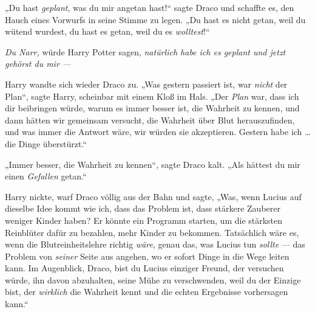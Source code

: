 „Du hast \emph{geplant}, was du mir angetan hast!“ sagte Draco und schaffte es, den Hauch eines Vorwurfs in seine Stimme zu legen.
„Du hast es nicht getan, weil du wütend wurdest, du hast es getan, weil du es \emph{wolltest}!“

\emph{Du Narr,} würde Harry Potter sagen, \emph{natürlich habe ich es geplant und jetzt gehörst du mir —}

Harry wandte sich wieder Draco zu.
„Was gestern passiert ist, war \emph{nicht} der Plan“, sagte Harry, scheinbar mit einem Kloß im Hals.
„Der \emph{Plan} war, dass ich dir beibringen würde, warum es immer besser ist, die Wahrheit zu kennen, und dann hätten wir gemeinsam versucht, die Wahrheit über Blut herauszufinden, und was immer die Antwort wäre, wir würden sie akzeptieren. Gestern habe ich … die Dinge überstürzt.“

„Immer besser, die Wahrheit zu kennen“, sagte Draco kalt.
„Als hättest du mir einen \emph{Gefallen} getan.“

Harry nickte, warf Draco völlig aus der Bahn und sagte,
„Was, wenn Lucius auf dieselbe Idee kommt wie ich, dass das Problem ist, dass stärkere Zauberer weniger Kinder haben? Er könnte ein Programm starten, um die stärksten Reinblüter dafür zu bezahlen, mehr Kinder zu bekommen. Tatsächlich wäre es, wenn die Blutreinheitslehre richtig \emph{wäre}, genau das, was Lucius tun \emph{sollte} — das Problem von \emph{seiner} Seite aus angehen, wo er sofort Dinge in die Wege leiten kann. Im Augenblick, Draco, bist du Lucius einziger Freund, der versuchen würde, ihn davon abzuhalten, seine Mühe zu verschwenden, weil du der Einzige bist, der \emph{wirklich} die Wahrheit kennt und die echten Ergebnisse vorhersagen kann.“

